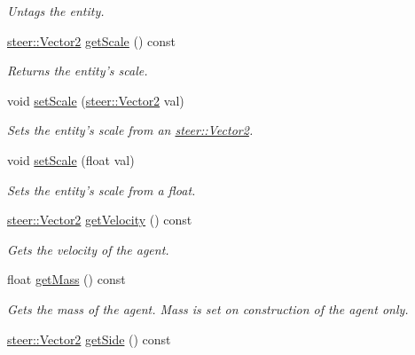 \begin{DoxyCompactItemize}
\begin{DoxyCompactList}\small\item\em Untags the entity. \end{DoxyCompactList}\item 
\hypertarget{classsteer_1_1_agent_aef3484610cf2bcce29965441a0e90edb}{\hyperlink{structsteer_1_1_vector2}{steer\-::\-Vector2} \hyperlink{classsteer_1_1_agent_aef3484610cf2bcce29965441a0e90edb}{get\-Scale} () const }\label{classsteer_1_1_agent_aef3484610cf2bcce29965441a0e90edb}

\begin{DoxyCompactList}\small\item\em Returns the entity's scale. \end{DoxyCompactList}\item 
void \hyperlink{classsteer_1_1_agent_a13bc7f1ce63a393a8de674d209221d17}{set\-Scale} (\hyperlink{structsteer_1_1_vector2}{steer\-::\-Vector2} val)
\begin{DoxyCompactList}\small\item\em Sets the entity's scale from an \hyperlink{structsteer_1_1_vector2}{steer\-::\-Vector2}. \end{DoxyCompactList}\item 
void \hyperlink{classsteer_1_1_agent_ab4203664470868ce7353feaf1d7f2b53}{set\-Scale} (float val)
\begin{DoxyCompactList}\small\item\em Sets the entity's scale from a float. \end{DoxyCompactList}\item 
\hypertarget{classsteer_1_1_agent_adf2555c6a33dbb7b8cf973ecf9abbe6b}{\hyperlink{structsteer_1_1_vector2}{steer\-::\-Vector2} \hyperlink{classsteer_1_1_agent_adf2555c6a33dbb7b8cf973ecf9abbe6b}{get\-Velocity} () const }\label{classsteer_1_1_agent_adf2555c6a33dbb7b8cf973ecf9abbe6b}

\begin{DoxyCompactList}\small\item\em Gets the velocity of the agent. \end{DoxyCompactList}\item 
\hypertarget{classsteer_1_1_agent_a00462a1d6b18521c74de9a4db68b593f}{float \hyperlink{classsteer_1_1_agent_a00462a1d6b18521c74de9a4db68b593f}{get\-Mass} () const }\label{classsteer_1_1_agent_a00462a1d6b18521c74de9a4db68b593f}

\begin{DoxyCompactList}\small\item\em Gets the mass of the agent. Mass is set on construction of the agent only. \end{DoxyCompactList}\item 
\hypertarget{classsteer_1_1_agent_a25da93e8d3da6648e1d6ca00945642a2}{\hyperlink{structsteer_1_1_vector2}{steer\-::\-Vector2} \hyperlink{classsteer_1_1_agent_a25da93e8d3da6648e1d6ca00945642a2}{get\-Side} () const }\label{classsteer_1_1_agent_a25da93e8d3da6648e1d6ca00945642a2}


\end{DoxyCompactItemize}
